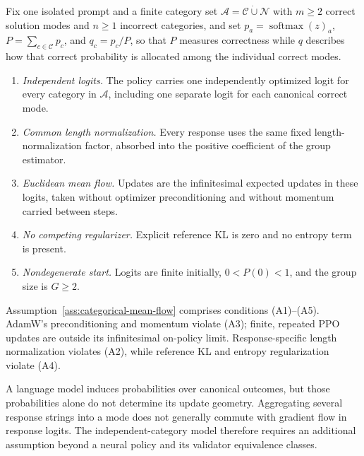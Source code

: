 \begin{assumption}
\label{ass:categorical-mean-flow}
Fix one isolated prompt and a finite category set
$\mathcal A=\mathcal C\mathbin{\dot\cup}\mathcal N$ with $m\ge2$ correct
solution modes and $n\ge1$ incorrect categories, and set
$p_a=\operatorname{softmax}(z)_a$, $P=\sum_{c\in\mathcal C}p_c$, and
$q_c=p_c/P$, so that $P$ measures correctness while $q$ describes how that
correct probability is allocated among the individual correct modes.
\begin{enumerate}
\item[(A1)] \emph{Independent logits.} The policy carries one independently
  optimized logit for every category in $\mathcal A$, including one separate
  logit for each canonical correct mode.
\item[(A2)] \emph{Common length normalization.} Every response uses the same
  fixed length-normalization factor, absorbed into the positive coefficient
  of the group estimator.
\item[(A3)] \emph{Euclidean mean flow.} Updates are the infinitesimal expected
  updates in these logits, taken without optimizer preconditioning and without
  momentum carried between steps.
\item[(A4)] \emph{No competing regularizer.} Explicit reference KL is zero and
  no entropy term is present.
\item[(A5)] \emph{Nondegenerate start.} Logits are finite initially,
  $0<P(0)<1$, and the group size is $G\ge2$.
\end{enumerate}
\end{assumption}

Assumption~\ref{ass:categorical-mean-flow} comprises conditions (A1)--(A5).
AdamW's preconditioning and momentum violate (A3); finite, repeated PPO
updates are outside its infinitesimal on-policy limit. Response-specific
length normalization violates (A2), while reference KL and entropy
regularization violate (A4).

A language model induces probabilities over canonical outcomes, but those
probabilities alone do not determine its update geometry. Aggregating several
response strings into a mode does not generally commute with gradient flow
in response logits. The independent-category model therefore requires an
additional assumption beyond a neural policy and its validator equivalence
classes.

